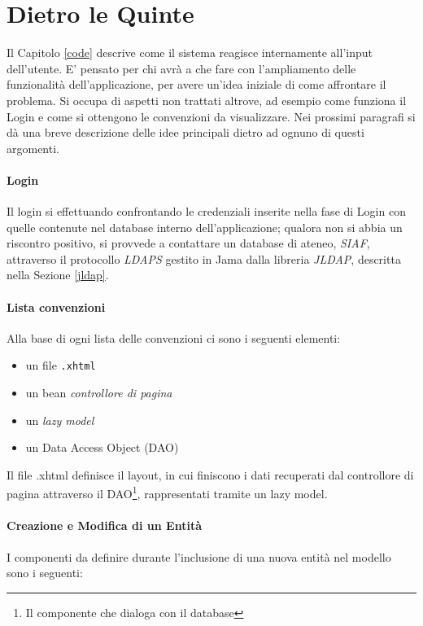 \section{Dietro le Quinte}
Il Capitolo \ref{code} descrive come il sistema reagisce internamente all'input dell'utente. E' pensato per chi avrà a che fare con l'ampliamento delle funzionalità dell'applicazione, per avere un'idea iniziale di come affrontare il problema. Si occupa di aspetti non trattati altrove, ad esempio come funziona il Login e come si ottengono le convenzioni da visualizzare.
Nei prossimi paragrafi si dà una breve descrizione delle idee principali dietro ad ognuno di questi argomenti.

\paragraph{Login}
Il login si effettuando confrontando le credenziali inserite nella fase di Login con quelle contenute nel database interno dell'applicazione; qualora non si abbia un riscontro positivo, si provvede a contattare un database di ateneo, \textsl{SIAF}, attraverso il protocollo \textsl{LDAPS} gestito in Jama dalla libreria \textsl{JLDAP}, descritta nella Sezione \ref{jldap}.

\paragraph{Lista convenzioni}
Alla base di ogni lista delle convenzioni ci sono i seguenti elementi:

\begin{itemize}
\item un file \texttt{.xhtml}
\item un bean \textsl{controllore di pagina}
\item un \textit{lazy model}
\item un Data Access Object (DAO)\newline
\end{itemize}

Il file .xhtml definisce il layout, in cui finiscono i dati recuperati dal controllore di pagina attraverso il DAO\footnote{Il componente che dialoga con il database}, rappresentati tramite un lazy model.

\paragraph{Creazione e Modifica di un Entità}
I componenti da definire durante l'inclusione di una nuova entità nel modello sono i seguenti:

